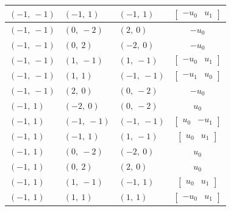 \documentclass[11pt]{article}
\theoremstyle{definition}
\begin{document}
\begin{longtable}{|l|l|l|c|}
    \hline
    $\left( -1, \  -1\right)$ & $\left( -1, \  1\right)$ & $\left( -1, \  1\right)$ & $\left[\begin{matrix}- u_{0} & u_{1}\end{matrix}\right]$ \\
    \hline
    $\left( -1, \  -1\right)$ & $\left( 0, \  -2\right)$ & $\left( 2, \  0\right)$ & $- u_{0}$ \\
    \hline
    $\left( -1, \  -1\right)$ & $\left( 0, \  2\right)$ & $\left( -2, \  0\right)$ & $- u_{0}$ \\
    \hline
    $\left( -1, \  -1\right)$ & $\left( 1, \  -1\right)$ & $\left( 1, \  -1\right)$ & $\left[\begin{matrix}- u_{0} & u_{1}\end{matrix}\right]$ \\
    \hline
    $\left( -1, \  -1\right)$ & $\left( 1, \  1\right)$ & $\left( -1, \  -1\right)$ & $\left[\begin{matrix}- u_{1} & u_{0}\end{matrix}\right]$ \\
    \hline
    $\left( -1, \  -1\right)$ & $\left( 2, \  0\right)$ & $\left( 0, \  -2\right)$ & $- u_{0}$ \\
    \hline
    $\left( -1, \  1\right)$ & $\left( -2, \  0\right)$ & $\left( 0, \  -2\right)$ & $u_{0}$ \\
    \hline
    $\left( -1, \  1\right)$ & $\left( -1, \  -1\right)$ & $\left( -1, \  -1\right)$ & $\left[\begin{matrix}u_{0} & - u_{1}\end{matrix}\right]$ \\
    \hline
    $\left( -1, \  1\right)$ & $\left( -1, \  1\right)$ & $\left( 1, \  -1\right)$ & $\left[\begin{matrix}u_{0} & u_{1}\end{matrix}\right]$ \\
    \hline
    $\left( -1, \  1\right)$ & $\left( 0, \  -2\right)$ & $\left( -2, \  0\right)$ & $u_{0}$ \\
    \hline
    $\left( -1, \  1\right)$ & $\left( 0, \  2\right)$ & $\left( 2, \  0\right)$ & $u_{0}$ \\
    \hline
    $\left( -1, \  1\right)$ & $\left( 1, \  -1\right)$ & $\left( -1, \  1\right)$ & $\left[\begin{matrix}u_{0} & u_{1}\end{matrix}\right]$ \\
    \hline
    $\left( -1, \  1\right)$ & $\left( 1, \  1\right)$ & $\left( 1, \  1\right)$ & $\left[\begin{matrix}- u_{0} & u_{1}\end{matrix}\right]$ \\

\end{longtable}
\end{document}

